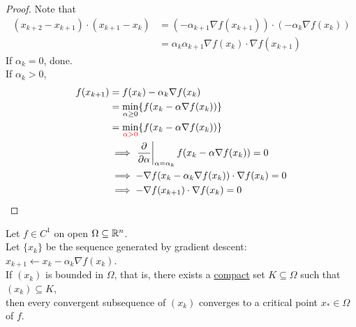 \documentclass{article}
\begin{document}
	\begin{proof}
		Note that
		\begin{align}
			(x_{k+2} - x_{k+1}) \cdot (x_{k+1} - x_k) &= (- \alpha_{k+1} \nabla f(x_{k+1})) \cdot  (- \alpha_{k} \nabla f(x_{k})) \\
			&= \alpha_k \alpha_{k+1} \nabla f(x_{k}) \cdot \nabla f(x_{k+1})
		\end{align}
		If $\alpha_k = 0$, done. \\
		If $\alpha_k > 0$,
		\begin{align}
			f(x_{k+1}) &= f(x_k) - \alpha_k \nabla f(x_k) \\
			&= \min_{\alpha \geq 0} \{f(x_k - \alpha \nabla f(x_k))\} \\
			&= \min_{\textcolor{red}{\alpha > 0}} \{f(x_k - \alpha \nabla f(x_k))\} \\
			&\implies \left. \frac{\partial{}}{\partial{\alpha}} \right|_{\alpha = \alpha_k} f(x_k - \alpha \nabla f(x_k)) = 0 \\
			&\implies - \nabla f(x_k - \alpha_k \nabla f(x_k)) \cdot \nabla f(x_k) = 0 \\
			&\implies - \nabla f(x_{k+1}) \cdot \nabla f(x_k) = 0
		\end{align}
	\end{proof}
	
	\begin{theorem}
		Let $f \in C^1$ on open $\Omega \subseteq \mathbb{R}^n$. \\
		Let $\{x_k\}$ be the sequence generated by gradient descent: $x_{k+1} \leftarrow x_k - \alpha_k \nabla f(x_k)$. \\
		If $(x_k)$ is bounded in $\Omega$, that is, there exists a \ul{compact} set $K \subseteq \Omega$ such that $(x_k) \subseteq K$, \\
		then every convergent subsequence of $(x_k)$ converges to a critical point $x_* \in \Omega$ of $f$. 
	\end{theorem}
	
\end{document}
